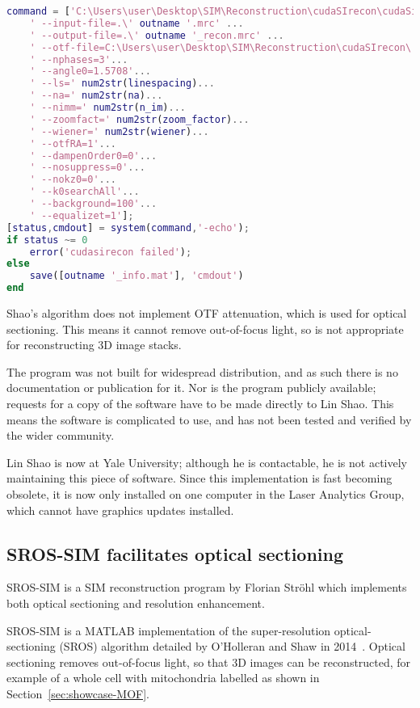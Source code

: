 \begin{lstfloat}
\begin{lstlisting}[language=matlab,caption={Lin Shao's CUDA reconstruction program is executed as a command line program through a MATLAB interface},label={snip:matlab-command},frame=single]
command = ['C:\Users\user\Desktop\SIM\Reconstruction\cudaSIrecon\cudaSireconDriver.exe' ...
    ' --input-file=.\' outname '.mrc' ...
    ' --output-file=.\' outname '_recon.mrc' ...
    ' --otf-file=C:\Users\user\Desktop\SIM\Reconstruction\cudaSIrecon\' otf_file '.mrc'...
    ' --nphases=3'...
    ' --angle0=1.5708'...
    ' --ls=' num2str(linespacing)...
    ' --na=' num2str(na)...
    ' --nimm=' num2str(n_im)...
    ' --zoomfact=' num2str(zoom_factor)...
    ' --wiener=' num2str(wiener)...
    ' --otfRA=1'...
    ' --dampenOrder0=0'...
    ' --nosuppress=0'...
    ' --nokz0=0'...
    ' --k0searchAll'...
    ' --background=100'...
    ' --equalizet=1'];
[status,cmdout] = system(command,'-echo');
if status ~= 0
    error('cudasirecon failed');
else
    save([outname '_info.mat'], 'cmdout')
end
\end{lstlisting}
\end{lstfloat}


Shao's algorithm does not implement OTF attenuation, which is used for optical sectioning.
This means it cannot remove out-of-focus light, so is not appropriate for reconstructing 3D image stacks.

The program was not built for widespread distribution, and as such there is no documentation or publication for it.
Nor is the program publicly available; requests for a copy of the software have to be made directly to Lin Shao.
This means the software is complicated to use, and has not been tested and verified by the wider community.

Lin Shao is now at Yale University; although he is contactable, he is not actively maintaining this piece of software.
Since this implementation is fast becoming obsolete, it is now only installed on one computer in the Laser Analytics Group, which cannot have graphics updates installed.

\subsection{SROS-SIM facilitates optical sectioning}
SROS-SIM is a SIM reconstruction program by Florian Str{\"o}hl which implements both optical sectioning and resolution enhancement.

SROS-SIM is a MATLAB implementation of the super-resolution optical-sectioning (SROS) algorithm detailed by O'Holleran and Shaw in 2014~\cite{oholleran2014optimized}.
Optical sectioning removes out-of-focus light, so that 3D images can be reconstructed, for example of a whole cell with mitochondria labelled as shown in Section~\ref{sec:showcase-MOF}.

